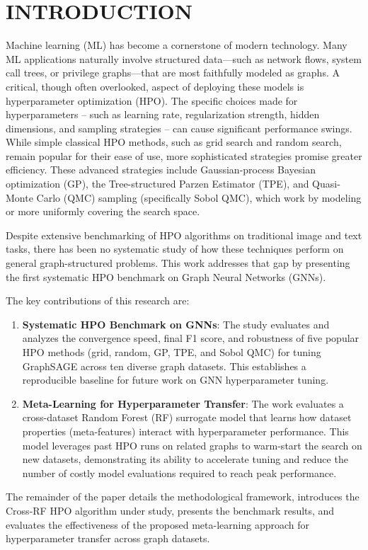\section{\uppercase{Introduction}}

Machine learning (ML) has become a cornerstone of modern technology. Many ML applications naturally involve structured data—such as network flows, system call trees, or privilege graphs—that are most faithfully modeled as graphs. A critical, though often overlooked, aspect of deploying these models is hyperparameter optimization (HPO). The specific choices made for hyperparameters -- such as learning rate, regularization strength, hidden dimensions, and sampling strategies -- can cause significant performance swings. While simple classical HPO methods, such as grid search and random search, remain popular for their ease of use, more sophisticated strategies promise greater efficiency. These advanced strategies include Gaussian-process Bayesian optimization (GP), the Tree-structured Parzen Estimator (TPE), and Quasi-Monte Carlo (QMC) sampling (specifically Sobol QMC), which work by modeling or more uniformly covering the search space.

Despite extensive benchmarking of HPO algorithms on traditional image and text tasks, there has been no systematic study of how these techniques perform on general graph-structured problems. This work addresses that gap by presenting the first systematic HPO benchmark on Graph Neural Networks (GNNs).

The key contributions of this research are:
\begin{enumerate}
	\item \textbf{Systematic HPO Benchmark on GNNs}: The study evaluates and analyzes the convergence speed, final F1 score, and robustness of five popular HPO methods (grid, random, GP, TPE, and Sobol QMC) for tuning GraphSAGE across ten diverse graph datasets. This establishes a reproducible baseline for future work on GNN hyperparameter tuning.
	\item \textbf{Meta-Learning for Hyperparameter Transfer}: The work evaluates a cross-dataset Random Forest (RF) surrogate model that learns how dataset properties (meta-features) interact with hyperparameter performance. This model leverages past HPO runs on related graphs to warm-start the search on new datasets, demonstrating its ability to accelerate tuning and reduce the number of costly model evaluations required to reach peak performance.
\end{enumerate}

The remainder of the paper details the methodological framework, introduces the Cross-RF HPO algorithm under study, presents the benchmark results, and evaluates the effectiveness of the proposed meta-learning approach for hyperparameter transfer across graph datasets.
